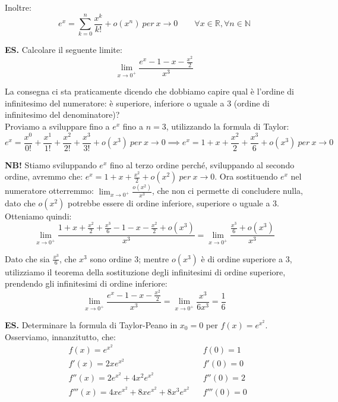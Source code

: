 \documentclass{article}
\begin{document}
\noindent Inoltre:
\begin{equation*}
    e^x = \sum_{k = 0}^n \frac{x^k}{k!} + o(x^n) \ per \ x \to 0 \qquad \forall x \in \mathbb{R}, \forall n \in \mathbb{N}
\end{equation*}

\noindent\textbf{ES.} Calcolare il seguente limite:
\begin{equation*}
    \lim_{x \to 0^+} \frac{e^x - 1 - x - \frac{x^2}{2}}{x^3}
\end{equation*}

\noindent La consegna ci sta praticamente dicendo che dobbiamo capire qual è l'ordine di infinitesimo del numeratore: è superiore, inferiore o uguale a $3$ (ordine di infinitesimo del denominatore)?\\
Proviamo a sviluppare fino a $e^x$ fino a $n = 3$, utilizzando la formula di Taylor:
\begin{equation*}
    e^x = \frac{x^0}{0!} + \frac{x^1}{1!} + \frac{x^2}{2!} + \frac{x^3}{3!} + o(x^3) \ per \ x \to 0 \implies e^x = 1 + x + \frac{x^2}{2} + \frac{x^3}{6} + o(x^3) \ per \ x \to 0
\end{equation*}

\noindent\textbf{NB!} Stiamo sviluppando $e^x$ fino al terzo ordine perché, sviluppando al secondo ordine, avremmo che: $e^x = 1 + x + \frac{x^2}{2} + o(x^2) \ per \ x \to 0$. Ora sostituendo $e^x$ nel numeratore otterremmo: $\lim_{x \to 0^+} \frac{o(x^2)}{x^3}$, che non ci permette di concludere nulla, dato che $o(x^2)$ potrebbe essere di ordine inferiore, superiore o uguale a $3$.\\

\noindent Otteniamo quindi:
\begin{equation*}
    \lim_{x \to 0^+} \frac{1 + x + \frac{x^2}{2} + \frac{x^3}{6} - 1 - x - \frac{x^2}{2} + o(x^3)}{x^3} = \lim_{x \to 0^+} \frac{\frac{x^3}{6} + o(x^3)}{x^3}
\end{equation*}

\noindent Dato che sia $\frac{x^3}{6}$, che $x^3$ sono ordine $3$; mentre $o(x^3)$ è di ordine superiore a $3$, utilizziamo il teorema della sostituzione degli infinitesimi di ordine superiore, prendendo gli infinitesimi di ordine inferiore:
\begin{equation*}
    \lim_{x \to 0^+} \frac{e^x - 1 - x - \frac{x^2}{2}}{x^3} = \lim_{x \to 0^+} \frac{x^3}{6x^3} = \frac{1}{6}
\end{equation*}

\noindent\textbf{ES.} Determinare la formula di Taylor-Peano in $x_0 = 0$ per $f(x) = e^{x^2}$.\\
Osserviamo, innanzitutto, che:
\begin{align*}
    & f(x) = e^{x^2} && f(0) = 1 \\
    & f'(x) = 2xe^{x^2} && f'(0) = 0 \\
    & f''(x) = 2e^{x^2} + 4x^2e^{x^2} && f''(0) = 2 \\
    & f'''(x) = 4xe^{x^2} + 8xe^{x^2} + 8x^3e^{x^2} && f'''(0) = 0
\end{align*}
\end{document}
